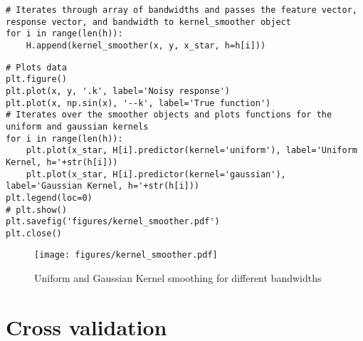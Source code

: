 \documentclass[10pt]{article}
\begin{document}
\begin{enumerate}[label=(\Alph*)]
\begin{lstlisting}
# Iterates through array of bandwidths and passes the feature vector, response vector, and bandwidth to kernel_smoother object
for i in range(len(h)):
    H.append(kernel_smoother(x, y, x_star, h=h[i]))
        \end{lstlisting}

        \begin{lstlisting}
# Plots data 
plt.figure()
plt.plot(x, y, '.k', label='Noisy response')
plt.plot(x, np.sin(x), '--k', label='True function')
# Iterates over the smoother objects and plots functions for the uniform and gaussian kernels
for i in range(len(h)):
    plt.plot(x_star, H[i].predictor(kernel='uniform'), label='Uniform Kernel, h='+str(h[i]))
    plt.plot(x_star, H[i].predictor(kernel='gaussian'), label='Gaussian Kernel, h='+str(h[i]))
plt.legend(loc=0)
# plt.show()
plt.savefig('figures/kernel_smoother.pdf')
plt.close()
        \end{lstlisting}

        \begin{figure}[ht] 
          \centering 
          \texttt{[image: figures/kernel\_smoother.pdf]}
          \caption{\label{fig:kernel_smoother}Uniform and Gaussian Kernel smoothing for different bandwidths}
        \end{figure}

    \end{enumerate}

\clearpage
    \section*{Cross validation}
\end{document}
